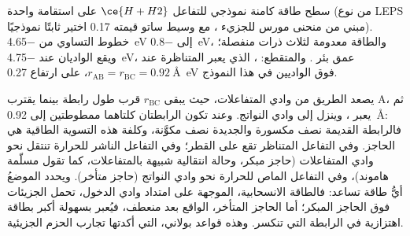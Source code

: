 \begin{omfigure}

{\small سطح طاقة كامنة نموذجي للتفاعل $\ce{H + H2}$ على استقامة واحدة (من نوع LEPS مبني
من منحنى مورس للجزيء ، مع وسيط ساتو قيمته 0.17 اختير ثابتًا
نموذجيًا). خطوط التساوي من \qty{-4.65}{eV} إلى \qty{-0.8}{eV}، والطاقة معدومة لثلاث ذرات منفصلة؛
ويقع الواديان عند \qty{-4.75}{eV}، عمق بئر . والمتقطع: ، الذي يعبر  المتناظرة عند $r_{\mathrm{AB}} = r_{\mathrm{BC}} = \qty{0.92}{\angstrom}$،
على ارتفاع \qty{0.27}{eV} فوق الواديين في هذا النموذج.}
\end{omfigure}

يصعد الطريق من وادي المتفاعلات، حيث يبقى $r_{\mathrm{BC}}$ قرب طول رابطة
 بينما يقترب A، ثم يعبر ، وينزل إلى وادي
النواتج. وعند  تكون الرابطتان كلتاهما ممطوطتين إلى \qty{0.92}{\angstrom}: فالرابطة
القديمة نصف مكسورة والجديدة نصف مكوَّنة، وكلفة هذه
التسوية الطاقية هي الحاجز. وفي التفاعل المتناظر تقع  على
القطر؛ وفي التفاعل الناشر للحرارة تنتقل نحو وادي المتفاعلات (حاجز
مبكر، وحالة انتقالية شبيهة بالمتفاعلات، كما تقول مسلّمة
هاموند)، وفي التفاعل الماص للحرارة نحو وادي النواتج (حاجز متأخر).
ويحدد الموضعُ أيُّ طاقة تساعد: فالطاقة الانسحابية، الموجهة على امتداد
وادي الدخول، تحمل الجزيئات فوق الحاجز المبكر؛ أما الحاجز
المتأخر، الواقع بعد منعطف، فيُعبر بسهولة أكبر بطاقة اهتزازية في
الرابطة التي تنكسر. وهذه قواعد بولاني، التي أكدتها تجارب
الحزم الجزيئية.

